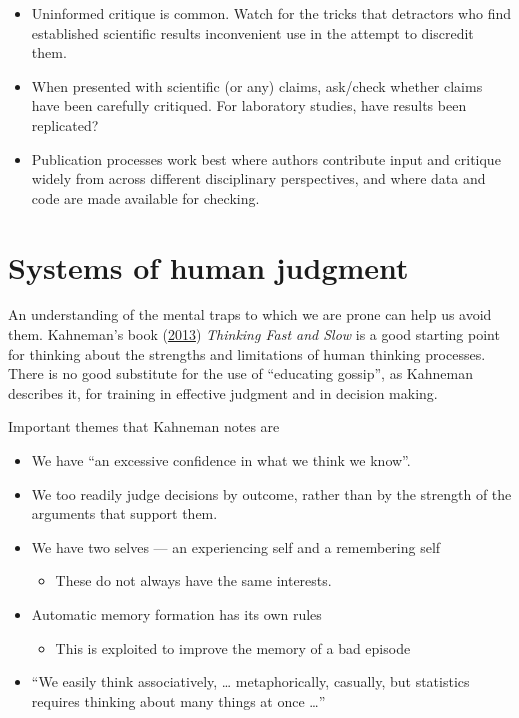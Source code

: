 \documentclass[
  10ptls,
  b5paper]{book}
\providecommand{\tightlist}{%
  \setlength{\itemsep}{0pt}\setlength{\parskip}{0pt}}
\begin{document}
\begin{enumerate}
  \begin{itemize}
  \tightlist
  \item
    Uninformed critique is common. Watch for the tricks that
    detractors who find established scientific results inconvenient
    use in the attempt to discredit them.
  \item
    When presented with scientific (or any) claims, ask/check
    whether claims have been carefully critiqued. For laboratory
    studies, have results been replicated?
  \item
    Publication processes work best where authors contribute
    input and critique widely from across different disciplinary
    perspectives, and where data and code are made available for
    checking.
  \end{itemize}
\end{enumerate}

\mainmatter

\hypertarget{systems-of-human-judgment}{%
\chapter{Systems of human judgment}\label{systems-of-human-judgment}}

An understanding of the mental traps to which we are prone can help us avoid them. Kahneman's book (\protect\hyperlink{ref-kahneman_2013}{2013}) \emph{Thinking Fast and Slow} is a good starting point for thinking about the strengths and limitations of human thinking processes. There is no good substitute for the use of ``educating gossip'', as Kahneman describes it, for training in effective judgment and in decision making.

Important themes that Kahneman notes are

\begin{itemize}
\tightlist
\item
  We have ``an excessive confidence in what we think we know''.
\item
  We too readily judge decisions by outcome, rather than by the
  strength of the arguments that support them.
\item
  We have two selves --- an experiencing self and a remembering self

  \begin{itemize}
  \tightlist
  \item
    These do not always have the same interests.
  \end{itemize}
\item
  Automatic memory formation has its own rules

  \begin{itemize}
  \tightlist
  \item
    This is exploited to improve the memory of a bad episode
  \end{itemize}
\item
  ``We easily think associatively, \ldots{} metaphorically, casually, but statistics requires thinking about many things at once \ldots{}''
\end{itemize}
\end{document}
